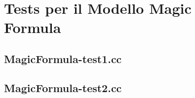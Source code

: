 \section{Tests per il Modello Magic Formula}
%
\subsection{MagicFormula-test1.cc}
\renewcommand{\baselinestretch}{1.0}

\renewcommand{\baselinestretch}{1.25}
%
\subsection{MagicFormula-test2.cc}
\renewcommand{\baselinestretch}{1.0}

\renewcommand{\baselinestretch}{1.25}